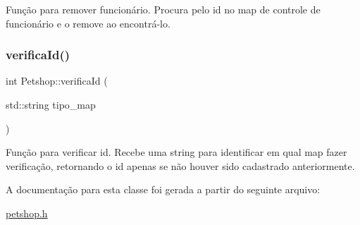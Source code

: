 Função para remover funcionário. Procura pelo id no map de controle de funcionário e o remove ao encontrá-\/lo. \mbox{\label{classPetshop_a84b268022826f11ab6ce36579d243d1b}} 
\subsubsection{\texorpdfstring{verifica\+Id()}{verificaId()}}
{\footnotesize\ttfamily int Petshop\+::verifica\+Id (\begin{DoxyParamCaption}\item[{std\+::string}]{tipo\+\_\+map }\end{DoxyParamCaption})}

Função para verificar id. Recebe uma string para identificar em qual map fazer verificação, retornando o id apenas se não houver sido cadastrado anteriormente. 

A documentação para esta classe foi gerada a partir do seguinte arquivo\+:\begin{DoxyCompactItemize}
\item 
\hyperlink{petshop_8h}{petshop.\+h}\end{DoxyCompactItemize}
